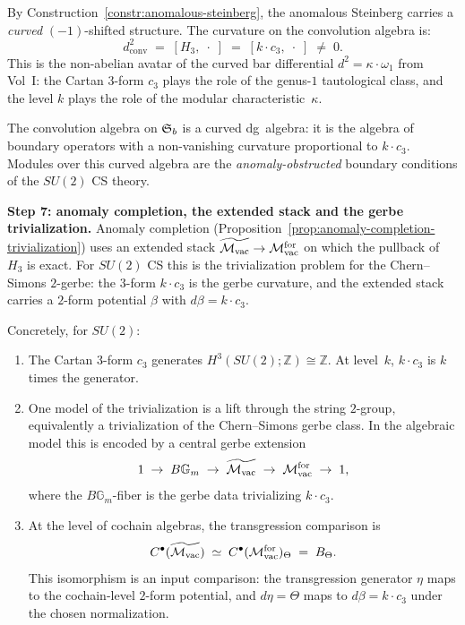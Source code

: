 \begin{construction}
By Construction~\ref{constr:anomalous-steinberg}, the anomalous
Steinberg carries a \emph{curved} $(-1)$-shifted structure. The
curvature on the convolution algebra is:
\begin{equation}\label{eq:su2-curved-convolution}
d^2_{\mathrm{conv}}
\;=\;
[H_3,\;\cdot\;]
\;=\;
[k\cdot c_3,\;\cdot\;]
\;\neq\; 0.
\end{equation}
This is the non-abelian avatar of the curved bar differential
$d^2 = \kappa\cdot\omega_1$ from Vol~I: the Cartan $3$-form
$c_3$ plays the role of the genus-$1$ tautological class, and the
level $k$ plays the role of the modular characteristic~$\kappa$.

The convolution algebra on $\mathfrak{S}_b$ is a curved dg~algebra: it is the
algebra of boundary operators with a non-vanishing curvature
proportional to $k\cdot c_3$. Modules over this curved algebra are
the \emph{anomaly-obstructed} boundary conditions of the $SU(2)$ CS
theory.

\medskip
\noindent\textbf{Step 7: anomaly completion, the extended stack
and the gerbe trivialization.}
Anomaly completion (Proposition~\ref{prop:anomaly-completion-trivialization})
uses an extended stack \(\widetilde{\mathcal{M}_{\mathrm{vac}}}\to\mathcal{M}_{\mathrm{vac}}^{\mathrm{for}}\)
on which the pullback of \(H_3\) is exact. For \(SU(2)\) CS this is
the trivialization problem for the Chern--Simons \(2\)-gerbe:
the \(3\)-form \(k\cdot c_3\) is the gerbe curvature, and the
extended stack carries a \(2\)-form potential \(\beta\) with
\(d\beta=k\cdot c_3\).

Concretely, for $SU(2)$:
\begin{enumerate}[label=\textup{(\roman*)}]
\item The Cartan $3$-form $c_3$ generates
 $H^3(SU(2);\mathbb Z)\cong\mathbb Z$. At level~$k$,
 $k\cdot c_3$ is $k$ times the generator.
\item One model of the trivialization is a lift through the
 string \(2\)-group, equivalently a trivialization of the
 Chern--Simons gerbe class. In the algebraic model this is encoded by
 a central gerbe extension
 \[
 1 \;\to\; B\mathbb G_m \;\to\;
 \widetilde{\mathcal{M}_{\mathrm{vac}}} \;\to\; \mathcal{M}_{\mathrm{vac}}^{\mathrm{for}} \;\to\; 1,
 \]
 where the $B\mathbb G_m$-fiber is the gerbe data trivializing
 $k\cdot c_3$.
\item At the level of cochain algebras, the transgression comparison is
 \begin{equation}\label{eq:su2-transgression-match}
 C^\bullet(\widetilde{\mathcal{M}_{\mathrm{vac}}})
 \;\simeq\;
 C^\bullet(\mathcal{M}_{\mathrm{vac}}^{\mathrm{for}})_\Theta
 \;=\;
 B_\Theta.
 \end{equation}
 This isomorphism is an input comparison: the transgression generator
 \(\eta\) maps to the cochain-level \(2\)-form potential, and
 \(d\eta=\Theta\) maps to \(d\beta=k\cdot c_3\) under the chosen
 normalization.
\end{enumerate}


\end{construction}
